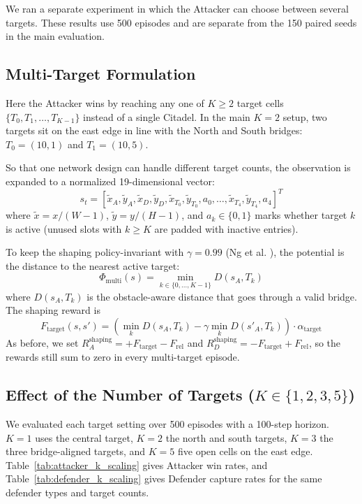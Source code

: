 \documentclass[conference]{IEEEtran}
\begin{document}
We ran a separate experiment in which the Attacker can choose between several targets. These results use 500 episodes and are separate from the 150 paired seeds in the main evaluation.

\subsection{Multi-Target Formulation}
Here the Attacker wins by reaching any one of $K \ge 2$ target cells $\{T_0, T_1, \dots, T_{K-1}\}$ instead of a single Citadel. In the main $K=2$ setup, two targets sit on the east edge in line with the North and South bridges: $T_0 = (10, 1)$ and $T_1 = (10, 5)$.

So that one network design can handle different target counts, the observation is expanded to a normalized 19-dimensional vector:
\begin{equation}
s_t = \left[ \tilde{x}_A, \tilde{y}_A, \tilde{x}_D, \tilde{y}_D, \tilde{x}_{T_0}, \tilde{y}_{T_0}, a_0, \dots, \tilde{x}_{T_4}, \tilde{y}_{T_4}, a_4 \right]^T
\end{equation}
where $\tilde{x} = x / (W-1)$, $\tilde{y} = y / (H-1)$, and $a_k \in \{0, 1\}$ marks whether target $k$ is active (unused slots with $k \ge K$ are padded with inactive entries).

To keep the shaping policy-invariant with $\gamma = 0.99$ (Ng et al. \cite{ng1999policy}), the potential is the distance to the nearest active target:
\begin{equation}
\Phi_{\text{multi}}(s) = \min_{k \in \{0, \dots, K-1\}} D(s_A, T_k)
\end{equation}
where $D(s_A, T_k)$ is the obstacle-aware distance that goes through a valid bridge. The shaping reward is
\begin{equation}
F_{\text{target}}(s, s') = \left( \min_{k} D(s_A, T_k) - \gamma \min_{k} D(s'_A, T_k) \right) \cdot \alpha_{\text{target}}
\end{equation}
As before, we set $R_A^{\text{shaping}} = +F_{\text{target}} - F_{\text{rel}}$ and $R_D^{\text{shaping}} = -F_{\text{target}} + F_{\text{rel}}$, so the rewards still sum to zero in every multi-target episode.

\subsection{Effect of the Number of Targets ($K \in \{1, 2, 3, 5\}$)}
We evaluated each target setting over 500 episodes with a 100-step horizon. $K=1$ uses the central target, $K=2$ the north and south targets, $K=3$ the three bridge-aligned targets, and $K=5$ five open cells on the east edge. Table~\ref{tab:attacker_k_scaling} gives Attacker win rates, and Table~\ref{tab:defender_k_scaling} gives Defender capture rates for the same defender types and target counts.
\end{document}
